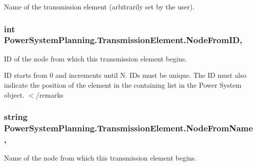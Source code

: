 Name of the transmission element (arbitrarily set by the user). 

\subsubsection[{\texorpdfstring{Node\+From\+ID}{NodeFromID}}]{\setlength{\rightskip}{0pt plus 5cm}int Power\+System\+Planning.\+Transmission\+Element.\+Node\+From\+ID\hspace{0.3cm}{\ttfamily [get]}, {\ttfamily [set]}}\hypertarget{class_power_system_planning_1_1_transmission_element_a050027a75710ba42d4d742cf78889f29}{}\label{class_power_system_planning_1_1_transmission_element_a050027a75710ba42d4d742cf78889f29}


ID of the node from which this transmission element begins. 

ID starts from 0 and increments until N. ID\textquotesingle{}s must be unique. The ID must also indicate the position of the element in the containing list in the Power System object. $<$/remarks 
\subsubsection[{\texorpdfstring{Node\+From\+Name}{NodeFromName}}]{\setlength{\rightskip}{0pt plus 5cm}string Power\+System\+Planning.\+Transmission\+Element.\+Node\+From\+Name\hspace{0.3cm}{\ttfamily [get]}, {\ttfamily [set]}}\hypertarget{class_power_system_planning_1_1_transmission_element_a6595ed8a111ff217d5437cc747b3a7c3}{}\label{class_power_system_planning_1_1_transmission_element_a6595ed8a111ff217d5437cc747b3a7c3}


Name of the node from which this transmission element begins. 

